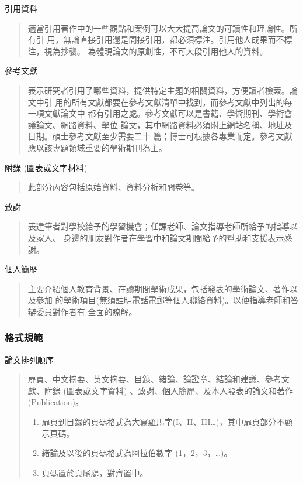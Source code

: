 \documentclass[
    writingLanguage=chinese, %
    addPageTitle=on,  %
    addDeclaration=on, %
    addMUSTlog=off, %
    addFigTOC=on, %
    addTabTOC=on, %
    refIndent=off, %
    printMod=off, %
]{.def/must}
\begin{document}
\noindent\faHandORight 引用資料
\begin{quote}
適當引用著作中的一些觀點和案例可以大大提高論文的可讀性和理論性。所有引
用，無論直接引用還是間接引用，都必須標注。引用他人成果而不標注，視為抄襲。
為體現論文的原創性，不可大段引用他人的資料。

\end{quote}

\noindent\faHandORight 參考文獻
\begin{quote}
表示研究者引用了哪些資料，提供特定主題的相關資料，方便讀者檢索。論文中引
用的所有文獻都要在參考文獻清單中找到，而參考文獻中列出的每一項文獻論文中
都有引用之處。參考文獻可以是書籍、學術期刊、學術會議論文、網路資料、學位
論文，其中網路資料必須附上網站名稱、地址及日期。碩士參考文獻至少需要二十
篇；博士可根據各專業而定。參考文獻應以該專題領域重要的學術期刊為主。

\end{quote}



\noindent\faHandORight 附錄 (圖表或文字材料)
\begin{quote}
此部分內容包括原始資料、資料分析和問卷等。

\end{quote}



\noindent\faHandORight 致謝
\begin{quote}
表達筆者對學校給予的學習機會；任課老師、論文指導老師所給予的指導以及家人、
身邊的朋友對作者在學習中和論文期間給予的幫助和支援表示感謝。
\end{quote}



\noindent\faHandORight 個人簡歷
\begin{quote}
主要介紹個人教育背景、在讀期間學術成果，包括發表的學術論文、著作以及參加
的學術項目(無須註明電話電郵等個人聯絡資料)。以便指導老師和答辯委員對作者有
全面的瞭解。
\end{quote}



\subsubsection{格式規範}

\noindent\faHandORight 論文排列順序
\begin{quote}
扉頁、中文摘要、英文摘要、目錄、緒論、論證章、結論和建議、參考文獻、附錄
(圖表或文字資料) 、致謝、個人簡歷、及本人發表的論文和著作 (Publication)。

\begin{enumerate}
    \item 扉頁到目錄的頁碼格式為大寫羅馬字(I、II、III…)，其中扉頁部分不顯示頁碼。
    \item 緒論及以後的頁碼格式為阿拉伯數字 (1，2，3，…)。
    \item 頁碼置於頁尾處，對齊置中。
\end{enumerate}

\end{quote}
\end{document}
